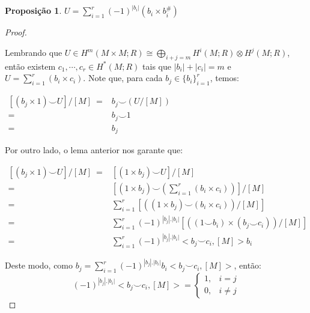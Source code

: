 \documentclass[12pt,oneside]{book} %
\newtheorem{prop}   {\hspace{0.5cm}Proposi\c c\~ao}[chapter]
\newcommand{\ds}{\displaystyle}
\newcommand{\ccup}{\smile}
\newcommand{\tensor}{\otimes}
\begin{document}
\begin{prop}\label{lema_para_euler}
	$U=\ds\sum_{i=1}^{r}(-1)^{|b_{i}|}\left( b_{i}\times b_{i}^{\#} \right)$
\end{prop}

\begin{proof}
	
	\
	
	\par Lembrando que $U\in H^{m}(M\times M;R)\cong \ds\bigoplus_{i+j=m}H^{i}(M;R)\tensor H^{j}(M;R)$, então existem $c_{1},\cdots,c_{r}\in H^{*}(M;R)$ tais que $|b_{i}|+|c_{i}|=m$ e $U=\ds\sum_{i=1}^{r}\left( b_{i}\times c_{i} \right)$. Note que, para cada $b_{j}\in \{b_{i}\}_{i=1}^{r}$, temos: \newline
	
	$ \begin{array}{rl}
		\left[ (b_{j}\times 1)\ccup U \right]/[M] \ = & b_{j}\ccup (U/[M]) \\ 
		= & b_{j}\ccup 1 \\
		= & b_{j}
	\end{array} $ \newline
	
	\par Por outro lado, o lema anterior nos garante que: \newline
	
	$ \begin{array}{rl}
		\left[ (b_{j}\times 1)\ccup U \right]/[M] \ = & \left[ (1\times b_{j})\ccup U \right]/[M] \\
		= & \left[ (1\times b_{j})\ccup \left( \ds\sum_{i=1}^{r}\left( b_{i}\times c_{i} \right) \right) \right]/[M] \\ 
		= & \ds\sum_{i=1}^{r}\left[ \left( (1\times b_{j})\ccup (b_{i}\times c_{i}) \right)/[M] \right] \\
		= & \ds\sum_{i=1}^{r}(-1)^{|b_{j}|.|b_{i}|}\left[ \left( (1\ccup b_{i})\times (b_{j}\ccup c_{i}) \right)/[M] \right] \\
		= & \ds\sum_{i=1}^{r}(-1)^{|b_{j}|.|b_{i}|}<b_{j}\ccup c_{i},[M]>b_{i}
	\end{array} $ \newline
	
	\par Deste modo, como $b_{j}=\ds\sum_{i=1}^{r}(-1)^{|b_{j}|.|b_{i}|}b_{i}<b_{j}\ccup c_{i},[M]>$, então:
	$$ (-1)^{|b_{j}|.|b_{i}|}<b_{j}\ccup c_{i},[M]>=\left\{ 
	\begin{array}{rl}
		1, & i=j \\
		0, & i\neq j
	\end{array}
	\right. $$
	

\end{proof}
\end{document}

